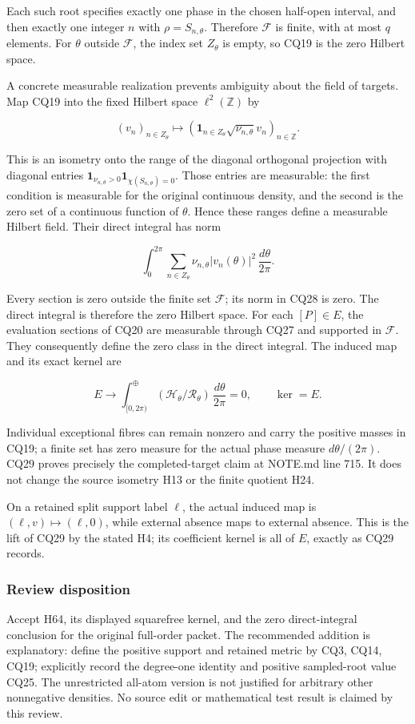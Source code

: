 Each such root specifies exactly one phase in the chosen half-open interval, and then exactly one integer \(n\) with \(\rho=S_{n,\theta}\). Therefore \(\mathcal F\) is finite, with at most \(q\) elements. For \(\theta\) outside \(\mathcal F\), the index set \(Z_\theta\) is empty, so CQ19 is the zero Hilbert space.

A concrete measurable realization prevents ambiguity about the field of targets. Map CQ19 into the fixed Hilbert space \(\ell^2(\mathbb Z)\) by

\[
(v_n)_{n\in Z_\theta}\longmapsto
\left(\mathbf1_{n\in Z_\theta}\sqrt{\nu_{n,\theta}}v_n\right)_{n\in\mathbb Z}.
\tag{CQ27}
\]

This is an isometry onto the range of the diagonal orthogonal projection with diagonal entries \(\mathbf1_{\nu_{n,\theta}>0} \mathbf1_{\chi(S_{n,\theta})=0}\). Those entries are measurable: the first condition is measurable for the original continuous density, and the second is the zero set of a continuous function of \(\theta\). Hence these ranges define a measurable Hilbert field. Their direct integral has norm

\[
\int_0^{2\pi}\sum_{n\in Z_\theta}
\nu_{n,\theta}|v_n(\theta)|^2\,\frac{d\theta}{2\pi}.
\tag{CQ28}
\]

Every section is zero outside the finite set \(\mathcal F\); its norm in CQ28 is zero. The direct integral is therefore the zero Hilbert space. For each \([P] \in E\), the evaluation sections of CQ20 are measurable through CQ27 and supported in \(\mathcal F\). They consequently define the zero class in the direct integral. The induced map and its exact kernel are

\[
E\longrightarrow
\int_{[0,2\pi)}^\oplus
(\mathcal H_\theta/\mathcal R_\theta)\,\frac{d\theta}{2\pi}
=0,
\qquad \ker=E.
\tag{CQ29}
\]

Individual exceptional fibres can remain nonzero and carry the positive masses in CQ19; a finite set has zero measure for the actual phase measure \(d\theta/(2 \pi)\). CQ29 proves precisely the completed-target claim at NOTE.md line 715. It does not change the source isometry H13 or the finite quotient H24.

On a retained split support label \(\ell\), the actual induced map is \((\ell,v) \longmapsto (\ell,0)\), while external absence maps to external absence. This is the lift of CQ29 by the stated H4; its coefficient kernel is all of \(E\), exactly as CQ29 records.

\subsubsection{Review disposition}\label{review-disposition}

Accept H64, its displayed squarefree kernel, and the zero direct-integral conclusion for the original full-order packet. The recommended addition is explanatory: define the positive support and retained metric by CQ3, CQ14, CQ19; explicitly record the degree-one identity and positive sampled-root value CQ25. The unrestricted all-atom version is not justified for arbitrary other nonnegative densities. No source edit or mathematical test result is claimed by this review.


\endgroup
